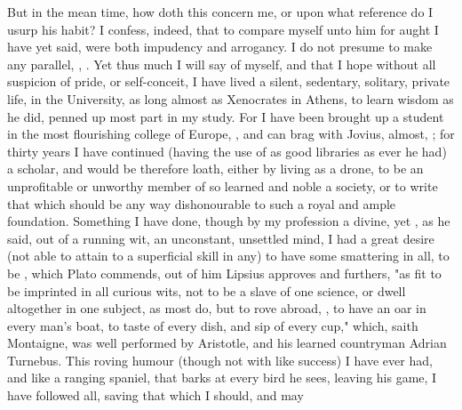 But in the mean time, how doth this concern me, or upon what reference do I
usurp his habit? I confess, indeed, that to compare myself unto him for aught I
have yet said, were both impudency and arrogancy. I do not presume to make any
parallel, , .
Yet thus much I will say of myself, and that I hope without all suspicion of
pride, or self-conceit, I have lived a silent, sedentary, solitary, private
life,  in the University, as long
almost as Xenocrates in Athens, 
to learn wisdom as he did, penned up most part in my study. For I have been
brought up a student in the most flourishing college of Europe,
, and can brag with
Jovius, almost, ; for thirty years I have continued (having the use of as good
libraries as ever he had) a scholar, and would be therefore
loath, either by living as a drone, to be an unprofitable or unworthy member of
so learned and noble a society, or to write that which should be any way
dishonourable to such a royal and ample foundation. Something I have done,
though by my profession a divine, yet , as
he said, out of a running wit, an unconstant, unsettled
mind, I had a great desire (not able to attain to a superficial skill in any)
to have some smattering in all, to be , which Plato commends, out of
him Lipsius approves and furthers, "as fit to be imprinted
in all curious wits, not to be a slave of one science, or dwell altogether in
one subject, as most do, but to rove abroad, , to have an oar in every man's boat, to
taste of every dish, and sip of every cup," which, saith
Montaigne, was well performed by Aristotle, and his learned
countryman Adrian Turnebus. This roving humour (though not with like success) I
have ever had, and like a ranging spaniel, that barks at every bird he sees,
leaving his game, I have followed all, saving that which I should, and may
